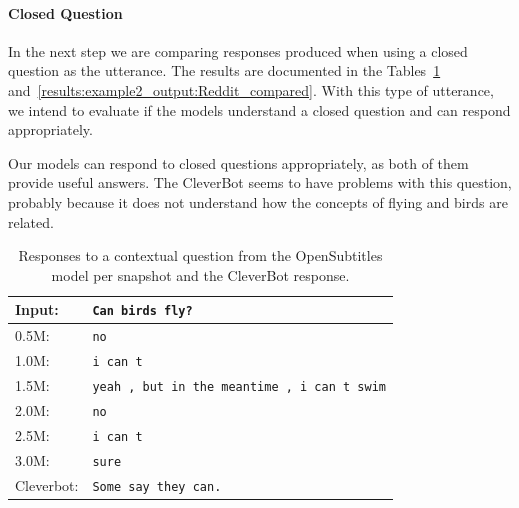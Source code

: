 \paragraph{Closed Question} In the next step we are comparing responses produced when using a closed question as the utterance. The results are documented in the Tables~\ref{results:example2_output:OpenSubtitle_compared} and~\ref{results:example2_output:Reddit_compared}. With this type of utterance, we intend to evaluate if the models understand a closed question and can respond appropriately.

Our models can respond to closed questions appropriately, as both of them provide useful answers. The CleverBot seems to have problems with this question, probably because it does not understand how the concepts of flying and birds are related.
\\
\begin{table}[H]
	\centering
	\begin{adjustbox}{max width=\textwidth}
		\begin{tabularx}{\textwidth}{lX}
			\toprule
			Input: 	& \texttt{Can birds fly?}\\
			\midrule
			0.5M: 	& \texttt{no}\\
			1.0M: 	& \texttt{i can t}\\
			1.5M:	& \texttt{yeah , but in the meantime , i can t swim}\\
			2.0M:	& \texttt{no}\\
			2.5M:	& \texttt{i can t}\\
			3.0M:	& \texttt{sure}\\
			Cleverbot:	& \texttt{Some say they can.}\\
			\bottomrule
		\end{tabularx}
	\end{adjustbox}
	\caption{Responses to a contextual question from the OpenSubtitles model per snapshot and the CleverBot response.}
	\label{results:example2_output:OpenSubtitle_compared}
\end{table}
